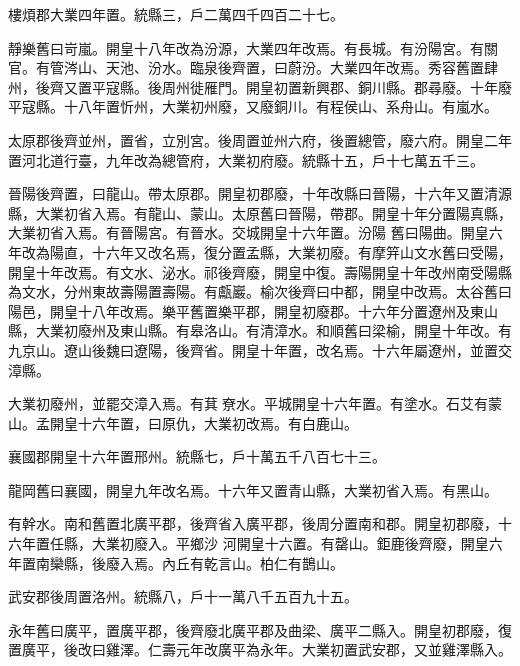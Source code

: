 \begin{pinyinscope}
 樓煩郡大業四年置。統縣三，戶二萬四千四百二十七。



 靜樂舊曰岢嵐。開皇十八年改為汾源，大業四年改焉。有長城。有汾陽宮。有關官。有管涔山、天池、汾水。臨泉後齊置，曰蔚汾。大業四年改焉。秀容舊置肆州，後齊又置平寇縣。後周州徙雁門。開皇初置新興郡、銅川縣。郡尋廢。十年廢平寇縣。十八年置忻州，大業初州廢，又廢銅川。有程侯山、系舟山。有嵐水。



 太原郡後齊並州，置省，立別宮。後周置並州六府，後置總管，廢六府。開皇二年置河北道行臺，九年改為總管府，大業初府廢。統縣十五，戶十七萬五千三。



 晉陽後齊置，曰龍山。帶太原郡。開皇初郡廢，十年改縣曰晉陽，十六年又置清源縣，大業初省入焉。有龍山、蒙山。太原舊曰晉陽，帶郡。開皇十年分置陽真縣，大業初省入焉。有晉陽宮。有晉水。交城開皇十六年置。汾陽
 舊曰陽曲。開皇六年改為陽直，十六年又改名焉，復分置孟縣，大業初廢。有摩笄山文水舊曰受陽，開皇十年改焉。有文水、泌水。祁後齊廢，開皇中復。壽陽開皇十年改州南受陽縣為文水，分州東故壽陽置壽陽。有甗巖。榆次後齊曰中都，開皇中改焉。太谷舊曰陽邑，開皇十八年改焉。樂平舊置樂平郡，開皇初廢郡。十六年分置遼州及東山縣，大業初廢州及東山縣。有皋洛山。有清漳水。和順舊曰梁榆，開皇十年改。有九京山。遼山後魏曰遼陽，後齊省。開皇十年置，改名焉。十六年屬遼州，並置交漳縣。



 大業初廢州，並罷交漳入焉。有萁尞水。平城開皇十六年置。有塗水。石艾有蒙山。孟開皇十六年置，曰原仇，大業初改焉。有白鹿山。



 襄國郡開皇十六年置邢州。統縣七，戶十萬五千八百七十三。



 龍岡舊曰襄國，開皇九年改名焉。十六年又置青山縣，大業初省入焉。有黑山。



 有幹水。南和舊置北廣平郡，後齊省入廣平郡，後周分置南和郡。開皇初郡廢，十六年置任縣，大業初廢入。平鄉沙
 河開皇十六置。有罄山。鉅鹿後齊廢，開皇六年置南欒縣，後廢入焉。內丘有乾言山。柏仁有鵲山。



 武安郡後周置洛州。統縣八，戶十一萬八千五百九十五。



 永年舊曰廣平，置廣平郡，後齊廢北廣平郡及曲梁、廣平二縣入。開皇初郡廢，復置廣平，後改曰雞澤。仁壽元年改廣平為永年。大業初置武安郡，又並雞澤縣入。




\end{pinyinscope}
